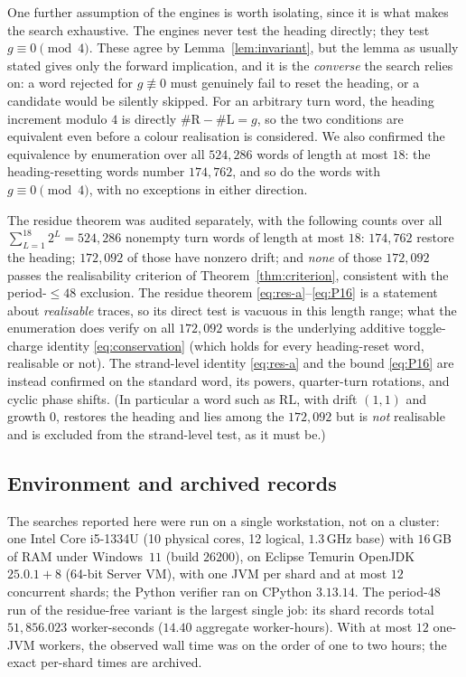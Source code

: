\documentclass[11pt,reqno]{amsart}
\theoremstyle{plain}
\theoremstyle{definition}
\newcommand{\growth}{g}
\newcommand{\turnR}{\mathrm{R}}
\newcommand{\turnL}{\mathrm{L}}
\begin{document}
One further assumption of the engines is worth isolating, since it is what makes the
search exhaustive. The engines never test the heading directly; they test
$\growth\equiv0\pmod4$. These agree by Lemma~\ref{lem:invariant}, but the lemma as
usually stated gives only the forward implication, and it is the \emph{converse} the
search relies on: a word rejected for $\growth\not\equiv0$ must genuinely fail to
reset the heading, or a candidate would be silently skipped. For an arbitrary turn
word, the heading increment modulo $4$ is directly
$\#\turnR-\#\turnL=\growth$, so the two conditions are equivalent even before a
colour realisation is considered. We also confirmed the equivalence by enumeration over all
$524{,}286$ words of length at most $18$: the heading-resetting words number
$174{,}762$, and so do the words with $\growth\equiv0\pmod4$, with no exceptions in
either direction.

The residue theorem was audited separately, with the following counts over all
$\sum_{L=1}^{18}2^{L}=524{,}286$ nonempty turn words of length at most $18$:
$174{,}762$ restore the heading; $172{,}092$ of those have nonzero drift; and
\emph{none} of those $172{,}092$ passes the realisability criterion of
Theorem~\ref{thm:criterion}, consistent with the period-$\le48$ exclusion. The
residue theorem \eqref{eq:res-a}--\eqref{eq:P16} is a statement about \emph{realisable}
traces, so its direct test is vacuous in this length range; what the enumeration does
verify on all $172{,}092$ words is the underlying additive toggle-charge identity
\eqref{eq:conservation} (which holds for every heading-reset word, realisable or not).
The strand-level identity \eqref{eq:res-a} and the bound \eqref{eq:P16} are instead
confirmed on the standard word, its powers, quarter-turn rotations, and cyclic phase
shifts. (In
particular a word such as $\turnR\turnL$, with drift $(1,1)$ and growth $0$, restores
the heading and lies among the $172{,}092$ but is \emph{not} realisable and is
excluded from the strand-level test, as it must be.)

\subsection*{Environment and archived records}

The searches reported here were run on a single workstation, not on a cluster: one
Intel Core i5-1334U (10 physical cores, 12 logical, $1.3$\,GHz base) with $16$\,GB of
RAM under Windows~$11$ (build $26200$), on Eclipse Temurin OpenJDK $25.0.1{+}8$
(64-bit Server VM), with one JVM per shard and at most $12$ concurrent shards; the
Python verifier ran on CPython $3.13.14$. The period-$48$ run of the residue-free
variant is the largest single job: its shard records total $51{,}856.023$ worker-seconds
($14.40$ aggregate worker-hours). With at most $12$ one-JVM workers, the observed wall
time was on the order of one to two hours; the exact per-shard times are archived.
\end{document}
